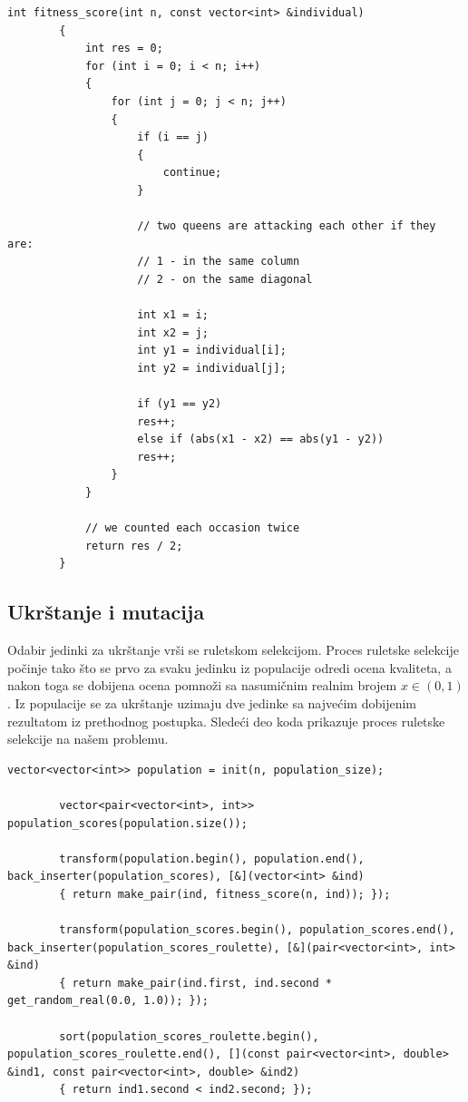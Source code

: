 \documentclass[12pt, a4paper]{article}
\begin{document}
	\begin{lstlisting}[caption={Funkcija za računanje ocene kvaliteta jedinke}]
		int fitness_score(int n, const vector<int> &individual)
		{
			int res = 0;
			for (int i = 0; i < n; i++)
			{
				for (int j = 0; j < n; j++)
				{
					if (i == j)
					{
						continue;
					}
					
					// two queens are attacking each other if they are:
					// 1 - in the same column
					// 2 - on the same diagonal
					
					int x1 = i;
					int x2 = j;
					int y1 = individual[i];
					int y2 = individual[j];
					
					if (y1 == y2)
					res++;
					else if (abs(x1 - x2) == abs(y1 - y2))
					res++;
				}
			}
			
			// we counted each occasion twice
			return res / 2;
		}
	\end{lstlisting}
	
	\subsection{Ukrštanje i mutacija}
	Odabir jedinki za ukrštanje vrši se ruletskom selekcijom. Proces ruletske selekcije počinje tako što se prvo za svaku jedinku iz populacije odredi ocena kvaliteta, a nakon toga se dobijena ocena pomnoži sa nasumičnim realnim brojem $x\in(0, 1)$. Iz populacije se za ukrštanje uzimaju dve jedinke sa najvećim dobijenim rezultatom iz prethodnog postupka. Sledeći deo koda prikazuje proces ruletske selekcije na našem problemu.\\
	
	\begin{lstlisting}[caption={Proces ruletske selekcije}]
		vector<vector<int>> population = init(n, population_size);
		
		vector<pair<vector<int>, int>> population_scores(population.size());
		
		transform(population.begin(), population.end(), back_inserter(population_scores), [&](vector<int> &ind)
		{ return make_pair(ind, fitness_score(n, ind)); });
		
		transform(population_scores.begin(), population_scores.end(), back_inserter(population_scores_roulette), [&](pair<vector<int>, int> &ind)
		{ return make_pair(ind.first, ind.second * get_random_real(0.0, 1.0)); });
		
		sort(population_scores_roulette.begin(), population_scores_roulette.end(), [](const pair<vector<int>, double> &ind1, const pair<vector<int>, double> &ind2)
		{ return ind1.second < ind2.second; });
	\end{lstlisting}
	
\end{document}
